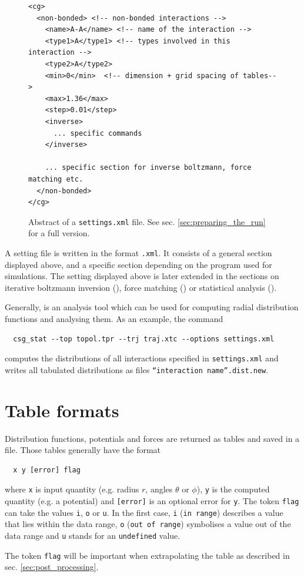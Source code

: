 \begin{figure}[h]
\centering
\begin{lstlisting}[frame=single]
<cg>
  <non-bonded> <!-- non-bonded interactions -->
    <name>A-A</name> <!-- name of the interaction -->
    <type1>A</type1> <!-- types involved in this interaction -->
    <type2>A</type2>
    <min>0</min>  <!-- dimension + grid spacing of tables-->
    <max>1.36</max>
    <step>0.01</step>
    <inverse>
      ... specific commands
    </inverse>

    ... specific section for inverse boltzmann, force matching etc.
  </non-bonded>
</cg>
\end{lstlisting}
\caption{Abstract of a \texttt{settings.xml} file. See sec. \ref{sec:preparing_the_run} for a full version.}
\end{figure}

A setting file is written in the format \texttt{.xml}. It consists of a general section displayed above, and a specific section depending on the program used for simulations. The setting displayed above is later extended in the sections on iterative boltzmann inversion (), force matching () or statistical analysis ().

Generally,  is an analysis tool which can be used for computing radial distribution functions and analysing them. As an example, the command

\begin{verbatim}
  csg_stat --top topol.tpr --trj traj.xtc --options settings.xml
\end{verbatim}

computes the distributions of all interactions specified in \texttt{settings.xml} and writes all tabulated distributions as files \texttt{``interaction name''.dist.new}.

\section{Table formats}
\label{sec:table_formats}
Distribution functions, potentials and forces are returned as tables and saved in a file. Those tables generally have the format
\begin{verbatim}
  x y [error] flag
\end{verbatim}
where \texttt{x} is input quantity (e.g. radius $r$, angles $\theta$ or $\phi$), \texttt{y} is the computed quantity (e.g. a potential) and \texttt{[error]} is an optional error for \texttt{y}. The token \texttt{flag} can take the values \texttt{i}, \texttt{o} or \texttt{u}.
In the first case, \texttt{i} (\texttt{in range}) describes a value that lies within the data range, \texttt{o} (\texttt{out of range}) symbolises a value out of the data range and \texttt{u} stands for an \texttt{undefined} value.

The token \texttt{flag} will be important when extrapolating the table as described in sec. \ref{sec:post_processing}.

